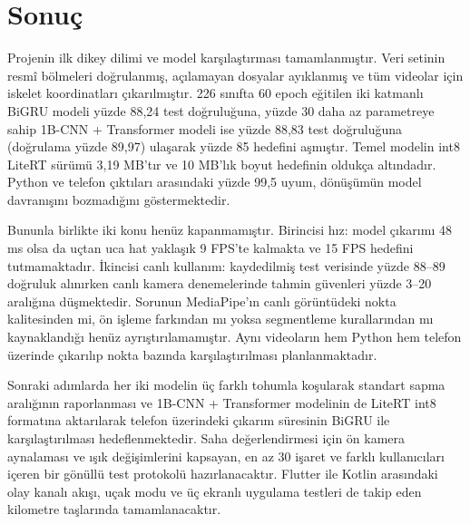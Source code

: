 \section{Sonuç}
\label{AltinciBolum}

Projenin ilk dikey dilimi ve model karşılaştırması tamamlanmıştır. Veri setinin
resmî bölmeleri doğrulanmış, açılamayan dosyalar ayıklanmış ve tüm videolar için
iskelet koordinatları çıkarılmıştır. 226 sınıfta 60 epoch eğitilen iki katmanlı
BiGRU modeli yüzde 88,24 test doğruluğuna, yüzde 30 daha az parametreye sahip
1B-CNN + Transformer modeli ise yüzde 88,83 test doğruluğuna (doğrulama yüzde
89,97) ulaşarak yüzde 85 hedefini aşmıştır. Temel modelin int8 LiteRT sürümü
3,19 MB'tır ve 10 MB'lık boyut hedefinin oldukça altındadır. Python ve telefon
çıktıları arasındaki yüzde 99,5 uyum, dönüşümün model davranışını bozmadığını
göstermektedir.

Bununla birlikte iki konu henüz kapanmamıştır. Birincisi hız: model çıkarımı 48 ms
olsa da uçtan uca hat yaklaşık 9 FPS'te kalmakta ve 15 FPS hedefini
tutmamaktadır. İkincisi canlı kullanım: kaydedilmiş test verisinde yüzde 88--89
doğruluk alınırken canlı kamera denemelerinde tahmin güvenleri yüzde 3--20
aralığına düşmektedir. Sorunun MediaPipe'ın canlı görüntüdeki nokta kalitesinden
mi, ön işleme farkından mı yoksa segmentleme kurallarından mı kaynaklandığı henüz
ayrıştırılamamıştır. Aynı videoların hem Python hem telefon üzerinde çıkarılıp
nokta bazında karşılaştırılması planlanmaktadır.

Sonraki adımlarda her iki modelin üç farklı tohumla koşularak standart sapma
aralığının raporlanması ve 1B-CNN + Transformer modelinin de LiteRT int8
formatına aktarılarak telefon üzerindeki çıkarım süresinin BiGRU ile
karşılaştırılması hedeflenmektedir. Saha değerlendirmesi için ön kamera
aynalaması ve ışık değişimlerini kapsayan, en az 30 işaret ve farklı kullanıcıları
içeren bir gönüllü test protokolü hazırlanacaktır. Flutter ile Kotlin arasındaki
olay kanalı akışı, uçak modu ve üç ekranlı uygulama testleri de takip eden
kilometre taşlarında tamamlanacaktır.
